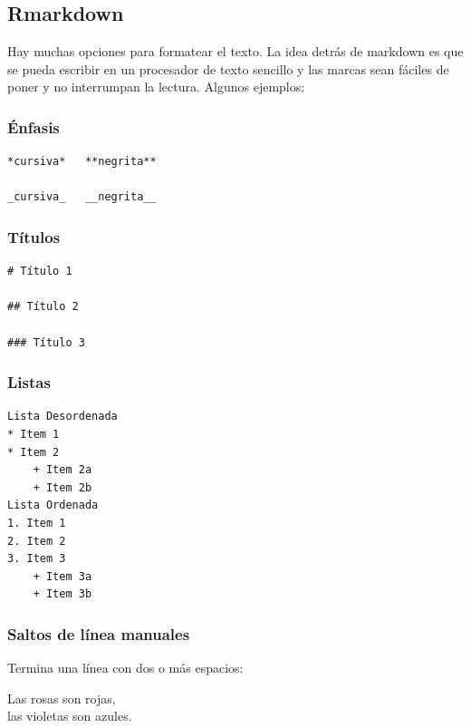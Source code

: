 \documentclass[]{book}
\theoremstyle{definition}
\theoremstyle{definition}
\theoremstyle{definition}
\theoremstyle{remark}
\begin{document}
\hypertarget{rmarkdown}{%
\subsection{Rmarkdown}\label{rmarkdown}}

Hay muchas opciones para formatear el texto. La idea detrás de markdown
es que se pueda escribir en un procesador de texto sencillo y las marcas
sean fáciles de poner y no interrumpan la lectura. Algunos ejemplos:

\hypertarget{enfasis}{%
\subsubsection{Énfasis}\label{enfasis}}

\begin{verbatim}
*cursiva*   **negrita**

_cursiva_   __negrita__
\end{verbatim}

\hypertarget{titulos}{%
\subsubsection{Títulos}\label{titulos}}

\begin{verbatim}
# Título 1

## Título 2

### Título 3
\end{verbatim}

\hypertarget{listas}{%
\subsubsection{Listas}\label{listas}}

\begin{verbatim}
Lista Desordenada
* Item 1
* Item 2
    + Item 2a
    + Item 2b
Lista Ordenada
1. Item 1
2. Item 2
3. Item 3
    + Item 3a
    + Item 3b
\end{verbatim}

\hypertarget{saltos-de-linea-manuales}{%
\subsubsection{Saltos de línea
manuales}\label{saltos-de-linea-manuales}}

Termina una línea con dos o más espacios:

Las rosas son rojas,\\
las violetas son azules.
\end{document}

